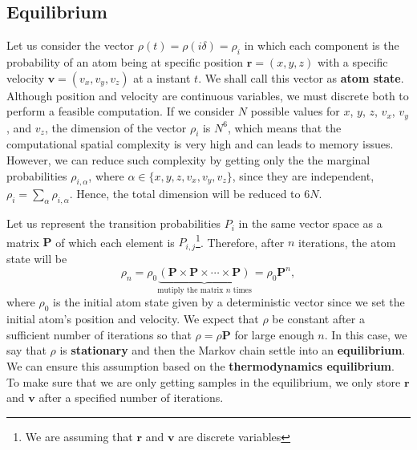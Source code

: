 \subsection{Equilibrium}
\label{sec:equilibrium}

Let us consider the vector $ \rho(t) = \rho(i\delta) = \rho_i $ in which each component is the probability of an atom being at specific position $ \mathbf{r} = (x, y, z) $ with a specific velocity $ \mathbf{v} = (v_x, v_y, v_z) $ at a instant $ t $.
We shall call this vector as \textbf{atom state}. Although position and velocity are continuous variables, we must discrete both to perform a feasible computation. If we consider $ N $ possible values for $ x $, $ y $, $ z $, $ v_x $, $ v_y $, and $ v_z $, the dimension of the vector $ \rho_i $ is $ N^6 $, which means that the computational spatial complexity is very high and can leads to memory issues. However, we can reduce such complexity by getting only the the marginal probabilities $ \rho_{i,\alpha} $, where $ \alpha \in \{x, y, z, v_x, v_y, v_z\} $, since they are independent, $ \rho_{i} = \sum_{\alpha} \rho_{i, \alpha} $. Hence, the total dimension will be reduced to $ 6N $.

Let us represent the transition probabilities $ P_i $ in the same vector space as a matrix $ \mathbf{P} $ of which each element is $ P_{i,j} $\footnote{We are assuming that $ \mathbf{r} $ and $ \mathbf{v} $ are discrete variables}. Therefore, after $ n $ iterations, the atom state will be \cite[Section~23.2]{wasserman2004all}
\begin{equation}
    \rho_n =  \rho_0 \underbrace{(\mathbf{P} \times \mathbf{P} \times \cdots \times \mathbf{P})}_{\textrm{mutiply the matrix $n$ times}} = \rho_0 \mathbf{P}^n,
\end{equation}
where $ \rho_0 $ is the initial atom state given by a deterministic vector since we set the initial atom's position and velocity. We expect that $ \rho $ be constant after a sufficient number of iterations so that $ \rho = \rho\mathbf{P} $ for large enough $ n $. In this case, we say that $ \rho $ is \textbf{stationary} and then the Markov chain settle into an \textbf{equilibrium}. We can ensure this assumption based on the \textbf{thermodynamics equilibrium}. To make sure that we are only getting samples in the equilibrium, we only store $ \mathbf{r} $ and $ \mathbf{v} $ after a specified number of iterations.

